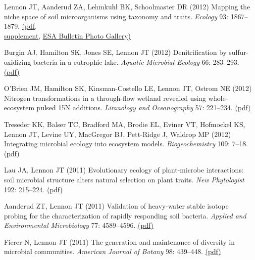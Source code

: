 \documentclass[11pt]{article}
\begin{document}
\begin{etaremune}
\item Lennon JT, Aanderud ZA, Lehmkuhl BK, Schoolmaster DR (2012) Mapping the niche space of soil microorganisms using taxonomy and traits. \textit{Ecology} 93: 1867–1879. \href{https://lennonlab.github.io/assets/publications/Lennon_etal_2012.pdf}{(pdf}, \\ \href{https://esapubs.org/archive/ecol/E093/165/}{supplement}, \href{https://lennonlab.github.io/assets/publications/Lennon_etal_2012_ESABull.pdf}{ESA Bulletin Photo Gallery)}

\item Burgin AJ, Hamilton SK, Jones SE, Lennon JT (2012) Denitrification by sulfur-oxidizing bacteria in a eutrophic lake. \textit{Aquatic Microbial Ecology} 66: 283–293. \href{https://lennonlab.github.io/assets/publications/Burgin_etal_2012.pdf}{(pdf)}

\item O'Brien JM, Hamilton SK, Kinsman-Costello LE, Lennon JT, Ostrom NE (2012) Nitrogen transformations in a through-flow wetland revealed using whole-ecosystem pulsed 15N additions. \textit{Limnology and Oceanography} 57: 221–234. \href{https://lennonlab.github.io/assets/publications/OBrien_etal_2012.pdf}{(pdf)}

\item Treseder KK, Balser TC, Bradford MA, Brodie EL, Eviner VT, Hofmockel KS, Lennon JT, Levine UY, MacGregor BJ, Pett-Ridge J, Waldrop MP (2012) Integrating microbial ecology into ecosystem models. \textit{Biogeochemistry} 109: 7–18. \href{https://lennonlab.github.io/assets/publications/Treseder_etal_2012.pdf}{(pdf)}

\item Lau JA, Lennon JT (2011) Evolutionary ecology of plant-microbe interactions: soil microbial structure alters natural selection on plant traits. \textit{New Phytologist} 192: 215–224. \href{https://lennonlab.github.io/assets/publications/Lau_Lennon_2011.pdf}{(pdf)}

\item Aanderud ZT, Lennon JT (2011) Validation of heavy-water stable isotope probing for the characterization of rapidly responding soil bacteria. \textit{Applied and Environmental Microbiology} 77: 4589–4596. \href{https://lennonlab.github.io/assets/publications/Aanderud_Lennon_2011.pdf}{(pdf)}

\item Fierer N, Lennon JT (2011) The generation and maintenance of diversity in microbial communities. \textit{American Journal of Botany} 98: 439–448. \href{https://lennonlab.github.io/assets/publications/Fierer_Lennon_2011.pdf}{(pdf)}


\end{etaremune}
\end{document}

